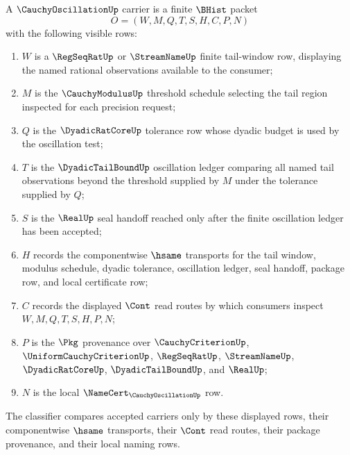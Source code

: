 \begin{definition}
\label{def:cauchy-oscillation-carrier}
A $\CauchyOscillationUp$ carrier is a finite $\BHist$ packet
$$
O=(W,M,Q,T,S,H,C,P,N)
$$
with the following visible rows:
\begin{enumerate}
\item $W$ is a $\RegSeqRatUp$ or $\StreamNameUp$ finite tail-window row, displaying the named rational observations available to the consumer;
\item $M$ is the $\CauchyModulusUp$ threshold schedule selecting the tail region inspected for each precision request;
\item $Q$ is the $\DyadicRatCoreUp$ tolerance row whose dyadic budget is used by the oscillation test;
\item $T$ is the $\DyadicTailBoundUp$ oscillation ledger comparing all named tail observations beyond the threshold supplied by $M$ under the tolerance supplied by $Q$;
\item $S$ is the $\RealUp$ seal handoff reached only after the finite oscillation ledger has been accepted;
\item $H$ records the componentwise $\hsame$ transports for the tail window, modulus schedule, dyadic tolerance, oscillation ledger, seal handoff, package row, and local certificate row;
\item $C$ records the displayed $\Cont$ read routes by which consumers inspect $W,M,Q,T,S,H,P,N$;
\item $P$ is the $\Pkg$ provenance over $\CauchyCriterionUp$, $\UniformCauchyCriterionUp$, $\RegSeqRatUp$, $\StreamNameUp$, $\DyadicRatCoreUp$, $\DyadicTailBoundUp$, and $\RealUp$;
\item $N$ is the local $\NameCert_{\CauchyOscillationUp}$ row.
\end{enumerate}
The classifier compares accepted carriers only by these displayed rows, their componentwise $\hsame$ transports, their $\Cont$ read routes, their package provenance, and their local naming rows.
\end{definition}

